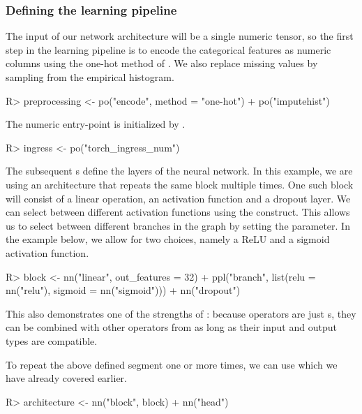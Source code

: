 \documentclass[article]{jss}
\theoremstyle{definition}
\begin{document}
\subsubsection{Defining the learning pipeline}
The input of our network architecture will be a single numeric tensor, so the first step in the learning pipeline is to encode the categorical features as numeric columns using the one-hot method of .
We also replace missing values by sampling from the empirical histogram.

\begin{CodeInput}
R> preprocessing <- po("encode", method = "one-hot") %
+    po("imputehist")
\end{CodeInput}

The numeric entry-point is initialized by .

\begin{CodeInput}
R> ingress <- po("torch_ingress_num")
\end{CodeInput}

The subsequent s define the layers of the neural network.
In this example, we are using an architecture that repeats the same block multiple times.
One such block will consist of a linear operation, an activation function and a dropout layer.
We can select between different activation functions using the  construct.
This allows us to select between different branches in the graph by setting the  parameter.
In the example below, we allow for two choices, namely a ReLU and a sigmoid activation function.

\begin{CodeInput}
R> block <- nn("linear", out_features = 32) %
+    ppl("branch", list(relu = nn("relu"), sigmoid = nn("sigmoid"))) %
+    nn("dropout")
\end{CodeInput}

This also demonstrates one of the strengths of : because  operators are just s, they can be combined with other operators from  as long as their input and output types are compatible.

To repeat the above defined segment one or more times, we can use  which we have already covered earlier.

\begin{CodeInput}
R> architecture <- nn("block", block) %
+    nn("head")
\end{CodeInput}
\end{document}
